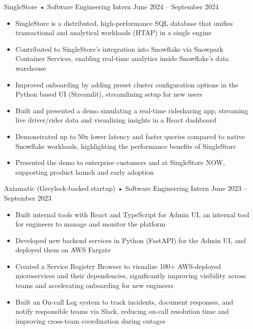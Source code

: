 \documentclass[9pt]{developercv} %
\begin{document}
\begin{entrylist}
	\entry
        {}
		{SingleStore • Software Engineering Intern}
		{June 2024 – September 2024}
		{\vspace{-8pt}
        \begin{itemize}[noitemsep,topsep=0pt,parsep=0pt,partopsep=0pt, leftmargin=10pt]
            \item SingleStore is a distributed, high-performance SQL database that unifies transactional and analytical workloads (HTAP) in a single engine
            \item Contributed to SingleStore's integration into Snowflake via Snowpark Container Services, enabling real-time analytics inside Snowflake's data warehouse
            \item Improved onboarding by adding preset cluster configuration options in the Python based UI (Streamlit), streamlining setup for new users
            \item Built and presented a demo simulating a real-time ridesharing app, streaming live driver/rider data and visualizing insights in a React dashboard
            \item Demonstrated up to 50x lower latency and faster queries compared to native Snowflake workloads, highlighting the performance benefits of SingleStore
            \item Presented the demo to enterprise customers and at SingleStore NOW, supporting product launch and early adoption
        \end{itemize}}
    \entry
        {}
		{Axiamatic (Greylock-backed startup) • Software Engineering Intern}
		{June 2023 – September 2023}
		{\vspace{-8pt}
        \begin{itemize}[noitemsep,topsep=0pt,parsep=0pt,partopsep=0pt, leftmargin=10pt]
            \item Built internal tools with React and TypeScript for Admin UI, an internal tool for engineers to manage and monitor the platform
            \item Developed new backend services in Python (FastAPI) for the Admin UI, and deployed them on AWS Fargate
            \item Created a Service Registry Browser to visualize 100+ AWS-deployed microservices and their dependencies, significantly improving visibility across teams and accelerating onboarding for new engineers
            \item Built an On-call Log system to track incidents, document responses, and notify responsible teams via Slack, reducing on-call resolution time and improving cross-team coordination during outages

\end{itemize}}
\end{entrylist}
\end{document}
